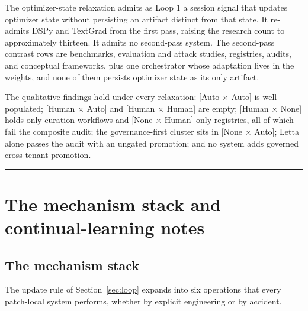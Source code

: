 \documentclass[
  11pt,
]{article}
\newcounter{none} %
\begin{document}
The optimizer-state relaxation admits as Loop 1 a session signal that updates optimizer state without persisting an artifact distinct from that state. It re-admits DSPy and TextGrad from the first pass, raising the research count to approximately thirteen. It admits no second-pass system. The second-pass contrast rows are benchmarks, evaluation and attack studies, registries, audits, and conceptual frameworks, plus one orchestrator whose adaptation lives in the weights, and none of them persists optimizer state as its only artifact.

The qualitative findings hold under every relaxation: {[}Auto × Auto{]} is well populated; {[}Human × Auto{]} and {[}Human × Human{]} are empty; {[}Human × None{]} holds only curation workflows and {[}None × Human{]} only registries, all of which fail the composite audit; the governance-first cluster sits in {[}None × Auto{]}; Letta alone passes the audit with an ungated promotion; and no system adds governed cross-tenant promotion.

\begin{center}\rule{0.5\linewidth}{0.5pt}\end{center}

\section{The mechanism stack and continual-learning notes}\label{app:mechanism}

\subsection{The mechanism stack}\label{app:mechanism-1}

The update rule of Section~\ref{sec:loop} expands into six operations that every patch-local system performs, whether by explicit engineering or by accident.
\end{document}
